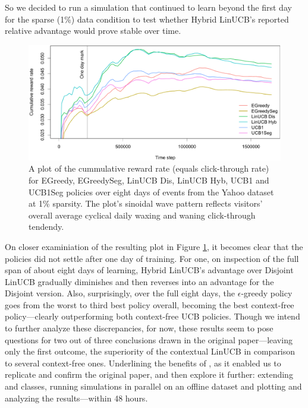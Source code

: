 \documentclass{jss}
\begin{document}
So we decided to run a simulation that continued to learn beyond the first day for the sparse (1\%) data condition to test whether Hybrid LinUCB's reported relative advantage would prove stable over time.

\begin{figure}[H]
  \centering
    \includegraphics[width=.99\textwidth]{fig/section_8_plot}
      \caption{A plot of the cummulative reward rate (equals click-through rate) for EGreedy, EGreedySeg, LinUCB Dis, LinUCB Hyb, UCB1 and UCB1Seg policies over eight days of events from the Yahoo dataset at 1\% sparsity. The plot's sinoidal wave pattern reflects visitors' overall average cyclical daily waxing and waning click-through tendendy.}
      \label{fig:section_8_plot}
\end{figure}

On closer examiniation of the resulting plot in Figure \ref{fig:section_8_plot}, it becomes clear that the policies did not settle after one day of training. For one, on inspection of the full span of about eight days of learning, Hybrid LinUCB's advantage over Disjoint LinUCB gradually diminishes and then reverses into an advantage for the Disjoint version. Also, surprisingly, over the full eight days, the $\epsilon$-greedy policy goes from the worst to third best policy overall, becoming the best context-free policy---clearly outperforming both context-free UCB policies. Though we intend to further analyze these discrepancies, for now, these results seem to pose questions for two out of three conclusions drawn in the original paper---leaving only the first outcome, the superiority of the contextual LinUCB in comparison to several context-free ones.  Underlining the benefits of , as it enabled us to replicate and confirm the original \cite{Li2010} paper, and then explore it further: extending  and  classes, running simulations in parallel on an offline dataset and plotting and analyzing the results---within 48 hours.
\end{document}
